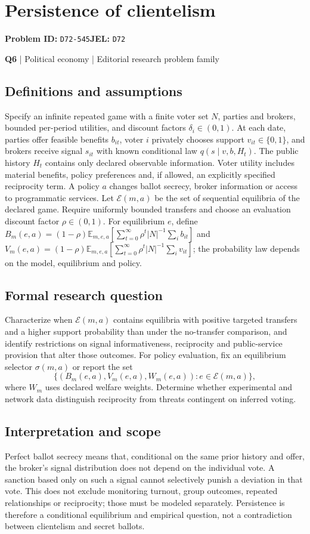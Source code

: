 \documentclass[11pt,a4paper]{article}
\begin{document}
\section*{Persistence of clientelism}
\textbf{Problem ID:} \texttt{D72-545}\quad \textbf{JEL:} \texttt{D72}\par
\label{problem:OP-0126}
\label{atlas:prob:Q6}
{\sffamily\small\color{muted}\textbf{Q6} | Political economy | Editorial research problem family\par}
\subsection*{Definitions and assumptions}
Specify an infinite repeated game with a finite voter set $N$, parties and brokers, bounded per-period utilities, and discount factors $\delta_i\in(0,1)$. At each date, parties offer feasible benefits $b_{it}$, voter $i$ privately chooses support $v_{it}\in\{0,1\}$, and brokers receive signal $s_{it}$ with known conditional law $q(s\mid v,b,H_t)$. The public history $H_t$ contains only declared observable information. Voter utility includes material benefits, policy preferences and, if allowed, an explicitly specified reciprocity term. A policy $a$ changes ballot secrecy, broker information or access to programmatic services. Let $\mathcal E(m,a)$ be the set of sequential equilibria of the declared game. Require uniformly bounded transfers and choose an evaluation discount factor $\rho\in(0,1)$. For equilibrium $e$, define $B_m(e,a)=(1-\rho)\mathbb E_{m,e,a}[\sum_{t=0}^{\infty}\rho^t |N|^{-1}\sum_i b_{it}]$ and $V_m(e,a)=(1-\rho)\mathbb E_{m,e,a}[\sum_{t=0}^{\infty}\rho^t |N|^{-1}\sum_i v_{it}]$; the probability law depends on the model, equilibrium and policy.
\subsection*{Formal research question}
Characterize when $\mathcal E(m,a)$ contains equilibria with positive targeted transfers and a higher support probability than under the no-transfer comparison, and identify restrictions on signal informativeness, reciprocity and public-service provision that alter those outcomes. For policy evaluation, fix an equilibrium selector $\sigma(m,a)$ or report the set
\[
\{(B_m(e,a),V_m(e,a),W_m(e,a)):e\in\mathcal E(m,a)\},
\]
where $W_m$ uses declared welfare weights. Determine whether experimental and network data distinguish reciprocity from threats contingent on inferred voting.
\subsection*{Interpretation and scope}
Perfect ballot secrecy means that, conditional on the same prior history and offer, the broker's signal distribution does not depend on the individual vote. A sanction based only on such a signal cannot selectively punish a deviation in that vote. This does not exclude monitoring turnout, group outcomes, repeated relationships or reciprocity; those must be modeled separately. Persistence is therefore a conditional equilibrium and empirical question, not a contradiction between clientelism and secret ballots.
\end{document}
